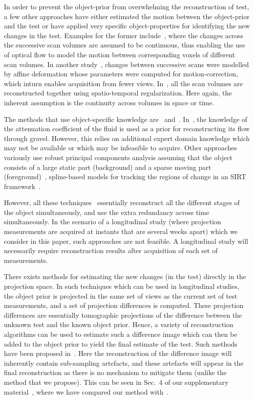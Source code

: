 \documentclass[journal]{IEEEtran}
\begin{document}
In order to prevent the object-prior from overwhelming the
reconstruction of test, a few other approaches have either estimated the
motion between the object-prior and the test or have applied very
specific object-properties for identifying the new changes in the
test.  Examples for the former include~\cite{koen2020}, where the
changes across the successive scan volumes are assumed to be
continuous, thus enabling the use of optical flow to model the motion
between corresponding voxels of different scan volumes. In another
study~\cite{vincent2017}, changes between successive scans were
modelled by affine deformation whose parameters were computed for
motion-correction, which inturn enables acquisition from fewer
views. In~\cite{daniil2015}, all the scan volumes are reconstructed
together using spatio-temporal regularization. Here again, the
inherent assumption is the continuity across volumes in space or
time.

The methods that use object-specific knowledge
are~\cite{Van2015} and~\cite{Marjolein2016}.  In~\cite{Van2015}, the
knowledge of the attenuation coefficient of the fluid is used as a
prior for reconstructing its flow through gravel. However, this relies
on additional expert domain knowledge which may not be available or
which may be infeasible to acquire. Other approaches variously use robust principal components
analysis assuming that the object consists of a large static part
(background) and a sparse moving part (foreground)~\cite{HaoGao},
spline-based models for tracking the regions of change in an SIRT
framework~\cite{Van2014}.

However, all these
techniques~\cite{daniil2015,koen2020,Van2015,HaoGao,Van2014}
essentially reconstruct all the different stages of the object
simultaneously, and use the extra redundancy across time
simultaneously. In the scenario of a longitudinal study (where
projection measurements are acquired at instants that are several
weeks apart) which we consider in this paper, such approaches are not
feasible. A longitudinal study will necessarily require reconstruction
results after acquisition of each set of measurements.

There exists methods for estimating the new changes (in the test)
directly in the projection space. In such techniques which can
be used in longitudinal studies, the object prior
is projected in the same set of views as the current set of test
measurements, and a set of projection differences is computed. These
projection differences are essentially tomographic projections of the
difference between the unknown test and the known object prior. Hence,
a variety of reconstruction algorithms can be used to estimate such a
difference image which can then be added to the object prior to yield
the final estimate of the test. Such methods have been proposed
in~\cite{Pourmorteza2015,Lee2012}. Here the reconstruction of the
difference image will inherently contain sub-sampling artefacts, and
these artefacts will appear in the final reconstruction as there is no
mechanism to mitigate them (unlike the method that we propose). This
can be seen in Sec.~4 of our supplementary material~\cite{supp_paper},
where we have compared our method with~\cite{Lee2012}.
\end{document}
